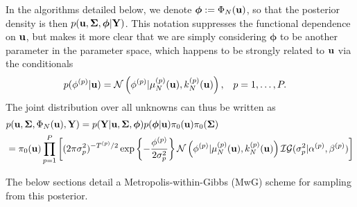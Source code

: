 \documentclass[12pt]{article}
\newcommand{\bphi}{\boldsymbol{\phi}}
\begin{document}
In the algorithms detailed below, we denote $\bphi := \indexDesign[\Ndesign]{\SSR}(\bpar)$, so that the posterior density is then $p(\bpar, \CovObs, \bphi | \stateMat)$. This notation suppresses 
the functional dependence on $\mathbf{u}$, but makes it more clear that we are simply considering $\bphi$ to be another parameter in the parameter space, which happens to be strongly 
related to $\mathbf{u}$ via the conditionals
\begin{align*}
&p({\phi}^{(p)} | \mathbf{u}) = \mathcal{N}\left({\phi}^{(p)} | \mu_{N}^{(p)}(\mathbf{u}), k_{N}^{(p)}(\mathbf{u}) \right), &&p = 1, \dots, P.
\end{align*}
The joint distribution over all unknowns can thus be written as
\begin{align}
&p(\bpar, \CovObs, \indexDesign[\Ndesign]{\SSR}(\bpar), \stateMat) = 
p(\stateMat | \bpar, \CovObs, \bphi)p(\bphi | \bpar) \priorDens(\bpar) \priorDens(\CovObs) \\
&= \priorDens(\bpar) \prod_{\objIdx=1}^{\Nobj} \left[(2\pi\sdObs^2_{\objIdx})^{-\indexObj{\Ntime}/2} \exp\left\{-\frac{\indexObj{\phi} }{2\sdObs^2_{\objIdx}} \right\} 
\Gaussian\left(\indexObj{\phi}  | \GPMeanPredOut{\Ndesign}{\objIdx}(\bpar), \GPKerPredOut{\Ndesign}{\objIdx}(\bpar)\right) \mathcal{IG}(\sdObs^2_{\objIdx}| \indexObj{\IGShape}, \indexObj{\IGScale}) \right] \nonumber
\end{align}

The below sections detail a Metropolis-within-Gibbs (MwG) scheme for sampling from this posterior. 

\end{document}
